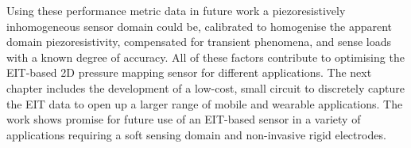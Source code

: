 Using these performance metric data in future work a piezoresistively inhomogeneous sensor domain could be, calibrated to homogenise the apparent domain piezoresistivity, compensated for transient phenomena, and sense loads with a known degree of accuracy. All of these factors contribute to optimising the EIT-based 2D pressure mapping sensor for different applications. The next chapter includes the development of a low-cost, small circuit to discretely capture the EIT data to open up a larger range of mobile and wearable applications. The work shows promise for future use of an EIT-based sensor in a variety of applications requiring a soft sensing domain and non-invasive rigid electrodes.

\afterpage{\blankpage}